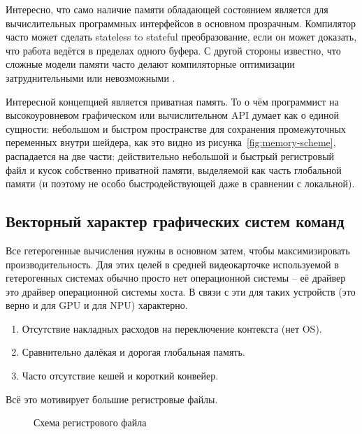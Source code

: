 Интересно, что само наличие памяти обладающей состоянием является для вычислительных программных интерфейсов в основном прозрачным. Компилятор часто может сделать stateless to stateful преобразование, если он может доказать, что работа ведётся в пределах одного буфера. С другой стороны известно, что сложные модели памяти часто делают компиляторные оптимизации затруднительными или невозможными \cite{vafeiadis2015common}.

Интересной концепцией является приватная память. То о чём программист на высокоуровневом графическом или вычислительном API думает как о единой сущности: небольшом и быстром пространстве для сохранения промежуточных переменных внутри шейдера, как это видно из рисунка~\ref{fig:memory-scheme}, распадается на две части: действительно небольшой и быстрый регистровый файл и кусок собственно приватной памяти, выделяемой как часть глобальной памяти (и поэтому не особо быстродействующей даже в сравнении с локальной).

\subsection{Векторный характер графических систем команд}\label{subsec:overview/logical/hw}

Все гетерогенные вычисления нужны в основном затем, чтобы максимизировать производительность.
Для этих целей в средней видеокарточке используемой в гетерогенных системах обычно просто нет операционной системы -- её драйвер это драйвер операционной системы хоста.
В связи с эти для таких устройств (это верно и для GPU и для NPU) характерно.

\begin{enumerate}
\item Отсутствие накладных расходов на переключение контекста (нет OS).
\item Сравнительно далёкая и дорогая глобальная память.
\item Часто отсутствие кешей и короткий конвейер.
\end{enumerate}

Всё это мотивирует большие регистровые файлы.

\begin{figure}[ht]
    \caption{Схема регистрового файла}\label{fig:genisa-addressing-base}
\end{figure}


